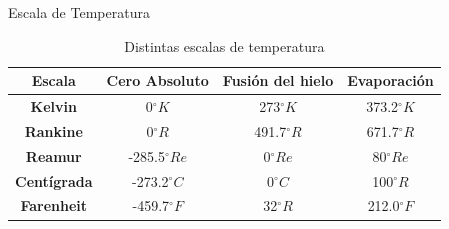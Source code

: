 \documentclass[aspectratio=169]{beamer}
\begin{document}
\begin{frame}{Escala de Temperatura}
\begin{table}[]
    \centering
    \begin{tabular}{c|c|c|c}
     \hline
         \hline
        \textbf{Escala} & \textbf{Cero Absoluto} &\textbf{Fusión del hielo} & \textbf{Evaporación} \\
         \hline
         \hline
       \textbf{Kelvin} & 0$ ^{\circ} K$ & 273$ ^{\circ} K$ & 373.2$ ^{\circ} K$ \\
       \textbf{Rankine} & 0$ ^{\circ} R$ & 491.7$ ^{\circ} R$ & 671.7$ ^{\circ} R$ \\
         \textbf{Reamur} & -285.5$ ^{\circ} Re$ & 0$ ^{\circ} Re$ & 80$ ^{\circ} Re$ \\
        \textbf{Centígrada} & -273.2$ ^{\circ} C$ & 0$ ^{\circ} C$ & 100$ ^{\circ} R$ \\
        \textbf{Farenheit} & -459.7$ ^{\circ} F$ & 32$ ^{\circ} R$ & 212.0$ ^{\circ} F$ \\
    \end{tabular}
    \caption{Distintas escalas de temperatura} \cite{cengel2003termodinamica}
    \label{tab:my_label}
\end{table}
\end{frame}
\end{document}
